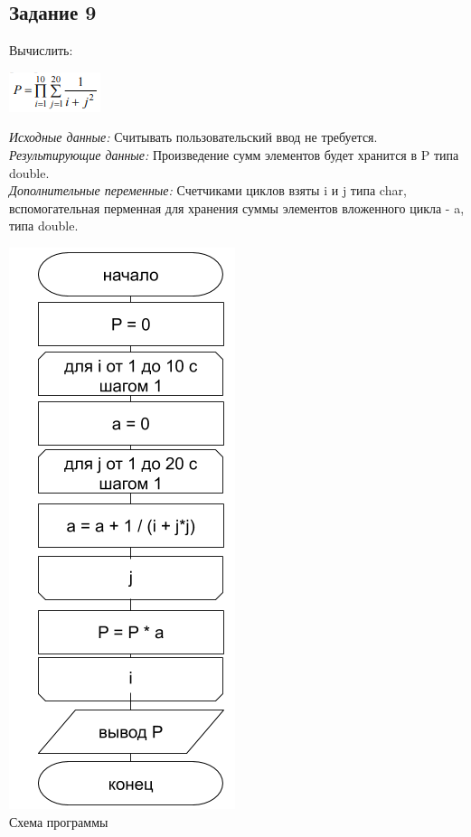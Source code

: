\documentclass[a4paper,14pt]{extarticle}
\begin{document}
\subsection{Задание 9}
Вычислить:\\
\begin{center}
\includegraphics[scale=1]{formula.png}
\end{center}
\textit{Исходные данные:} Считывать пользовательский ввод не требуется.\\
\textit{Результирующие данные:} Произведение сумм элементов будет хранится в P типа double.\\
\textit{Дополнительные переменные:} Счетчиками циклов взяты i и j типа char, вспомогательная перменная для хранения суммы элементов вложенного цикла - a, типа double.\\
\begin{center}
\includegraphics[scale=0.6]{lab2-9.png}\\
Схема программы
\end{center}
\end{document}

